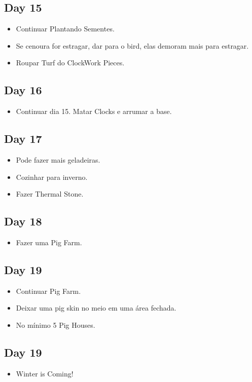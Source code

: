 \documentclass{article}
\begin{document}
\subsection{Day 15}
\begin{itemize}
    \item Continuar Plantando Sementes.
    \item Se cenoura for estragar, dar para o bird, elas demoram mais para estragar.
    \item Roupar Turf do ClockWork Pieces.
\end{itemize}

\subsection{Day 16}
\begin{itemize}
    \item Continuar dia 15. Matar Clocks e arrumar a base.
\end{itemize}

\subsection{Day 17}
\begin{itemize}
    \item Pode fazer mais geladeiras.
    \item Cozinhar para inverno.
    \item Fazer Thermal Stone.
\end{itemize}

\subsection{Day 18}
\begin{itemize}
    \item Fazer uma Pig Farm.
\end{itemize}

\subsection{Day 19}
\begin{itemize}
    \item Continuar Pig Farm.
    \item Deixar uma pig skin no meio em uma área fechada.
    \item No mínimo 5 Pig Houses.
\end{itemize}

\subsection{Day 19}
\begin{itemize}
    \item Winter is Coming!
\end{itemize}
\end{document}
